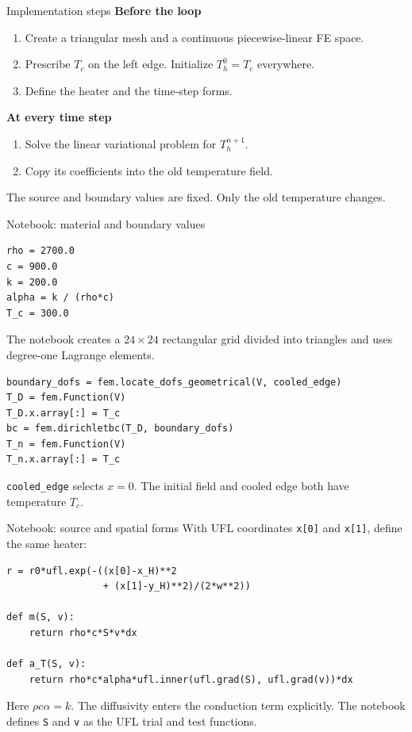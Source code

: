 \documentclass[11pt,aspectratio=169]{beamer}
\begin{document}
\begin{frame}{Implementation steps}
\textbf{Before the loop}
\begin{enumerate}
\item Create a triangular mesh and a continuous piecewise-linear FE space.
\item Prescribe $T_c$ on the left edge. Initialize $T_h^0=T_c$ everywhere.
\item Define the heater and the time-step forms.
\end{enumerate}
\medskip
\textbf{At every time step}
\begin{enumerate}
\item Solve the linear variational problem for $T_h^{n+1}$.
\item Copy its coefficients into the old temperature field.
\end{enumerate}
\medskip
The source and boundary values are fixed. Only the old temperature changes.
\end{frame}

\begin{frame}[fragile]{Notebook: material and boundary values}
\begin{lstlisting}
rho = 2700.0
c = 900.0
k = 200.0
alpha = k / (rho*c)
T_c = 300.0
\end{lstlisting}
The notebook creates a $24\times24$ rectangular grid divided into triangles
and uses degree-one Lagrange elements.
\begin{lstlisting}
boundary_dofs = fem.locate_dofs_geometrical(V, cooled_edge)
T_D = fem.Function(V)
T_D.x.array[:] = T_c
bc = fem.dirichletbc(T_D, boundary_dofs)
T_n = fem.Function(V)
T_n.x.array[:] = T_c
\end{lstlisting}
\texttt{cooled\_edge} selects $x=0$. The initial field and cooled edge both have temperature $T_c$.
\end{frame}

\begin{frame}[fragile]{Notebook: source and spatial forms}
With UFL coordinates \texttt{x[0]} and \texttt{x[1]}, define the same heater:
\begin{lstlisting}
r = r0*ufl.exp(-((x[0]-x_H)**2
                 + (x[1]-y_H)**2)/(2*w**2))

def m(S, v):
    return rho*c*S*v*dx

def a_T(S, v):
    return rho*c*alpha*ufl.inner(ufl.grad(S), ufl.grad(v))*dx
\end{lstlisting}
Here $\rho c\alpha=k$. The diffusivity enters the conduction term explicitly.
The notebook defines \texttt{S} and \texttt{v} as the UFL trial and test functions.
\end{frame}
\end{document}
